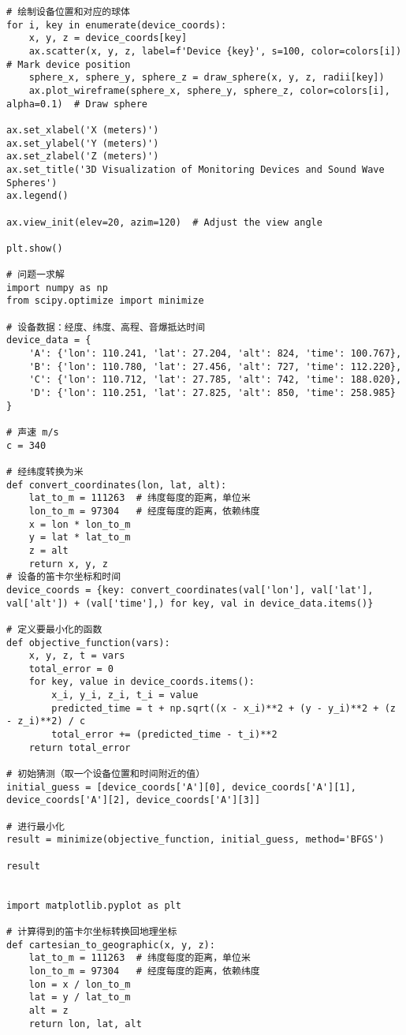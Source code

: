 \documentclass[withoutpreface,bwprint,12pt,a4paper]{cumcmthesis}
\begin{document}
\begin{appendices}
\begin{lstlisting}
# 绘制设备位置和对应的球体
for i, key in enumerate(device_coords):
    x, y, z = device_coords[key]
    ax.scatter(x, y, z, label=f'Device {key}', s=100, color=colors[i])  # Mark device position
    sphere_x, sphere_y, sphere_z = draw_sphere(x, y, z, radii[key])
    ax.plot_wireframe(sphere_x, sphere_y, sphere_z, color=colors[i], alpha=0.1)  # Draw sphere

ax.set_xlabel('X (meters)')
ax.set_ylabel('Y (meters)')
ax.set_zlabel('Z (meters)')
ax.set_title('3D Visualization of Monitoring Devices and Sound Wave Spheres')
ax.legend()

ax.view_init(elev=20, azim=120)  # Adjust the view angle

plt.show()

# 问题一求解
import numpy as np
from scipy.optimize import minimize

# 设备数据：经度、纬度、高程、音爆抵达时间
device_data = {
    'A': {'lon': 110.241, 'lat': 27.204, 'alt': 824, 'time': 100.767},
    'B': {'lon': 110.780, 'lat': 27.456, 'alt': 727, 'time': 112.220},
    'C': {'lon': 110.712, 'lat': 27.785, 'alt': 742, 'time': 188.020},
    'D': {'lon': 110.251, 'lat': 27.825, 'alt': 850, 'time': 258.985}
}

# 声速 m/s
c = 340

# 经纬度转换为米
def convert_coordinates(lon, lat, alt):
    lat_to_m = 111263  # 纬度每度的距离，单位米
    lon_to_m = 97304   # 经度每度的距离，依赖纬度
    x = lon * lon_to_m
    y = lat * lat_to_m
    z = alt
    return x, y, z
# 设备的笛卡尔坐标和时间
device_coords = {key: convert_coordinates(val['lon'], val['lat'], val['alt']) + (val['time'],) for key, val in device_data.items()}

# 定义要最小化的函数
def objective_function(vars):
    x, y, z, t = vars
    total_error = 0
    for key, value in device_coords.items():
        x_i, y_i, z_i, t_i = value
        predicted_time = t + np.sqrt((x - x_i)**2 + (y - y_i)**2 + (z - z_i)**2) / c
        total_error += (predicted_time - t_i)**2
    return total_error

# 初始猜测（取一个设备位置和时间附近的值）
initial_guess = [device_coords['A'][0], device_coords['A'][1], device_coords['A'][2], device_coords['A'][3]]

# 进行最小化
result = minimize(objective_function, initial_guess, method='BFGS')

result


import matplotlib.pyplot as plt

# 计算得到的笛卡尔坐标转换回地理坐标
def cartesian_to_geographic(x, y, z):
    lat_to_m = 111263  # 纬度每度的距离，单位米
    lon_to_m = 97304   # 经度每度的距离，依赖纬度
    lon = x / lon_to_m
    lat = y / lat_to_m
    alt = z
    return lon, lat, alt


\end{lstlisting}
\end{appendices}
\end{document}
